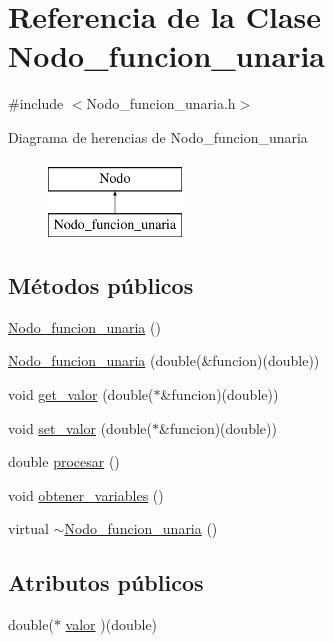 \hypertarget{class_nodo__funcion__unaria}{}\section{Referencia de la Clase Nodo\+\_\+funcion\+\_\+unaria}
\label{class_nodo__funcion__unaria}


{\ttfamily \#include $<$Nodo\+\_\+funcion\+\_\+unaria.\+h$>$}

Diagrama de herencias de Nodo\+\_\+funcion\+\_\+unaria\begin{figure}[H]
\begin{center}
\leavevmode
\includegraphics[height=2.000000cm]{class_nodo__funcion__unaria}
\end{center}
\end{figure}
\subsection*{Métodos públicos}
\begin{DoxyCompactItemize}
\item 
\hyperlink{class_nodo__funcion__unaria_ad8b8270d7c2bcdefbd7fe8ec0a2ad660}{Nodo\+\_\+funcion\+\_\+unaria} ()
\item 
\hyperlink{class_nodo__funcion__unaria_aae3c3384f4214e8c21b992894228023e}{Nodo\+\_\+funcion\+\_\+unaria} (double(\&funcion)(double))
\item 
void \hyperlink{class_nodo__funcion__unaria_ada80a2928510b76650aa2c336f9db8fa}{get\+\_\+valor} (double($\ast$\&funcion)(double))
\item 
void \hyperlink{class_nodo__funcion__unaria_a4634ffcf664c11c2cd5d4546c429476c}{set\+\_\+valor} (double($\ast$\&funcion)(double))
\item 
double \hyperlink{class_nodo__funcion__unaria_a1d6be00c52fad541beccf20bcf1a9122}{procesar} ()
\item 
void \hyperlink{class_nodo__funcion__unaria_a12bf4ec6430f11f4ffb4421a2f4af6f0}{obtener\+\_\+variables} ()
\item 
virtual \hyperlink{class_nodo__funcion__unaria_abd0b606fe115658eded2e1b65c2a94b5}{$\sim$\+Nodo\+\_\+funcion\+\_\+unaria} ()
\end{DoxyCompactItemize}
\subsection*{Atributos públicos}
\begin{DoxyCompactItemize}
\item 
double($\ast$ \hyperlink{class_nodo__funcion__unaria_ab9407e53aabe85b4c725b82a1f4a25be}{valor} )(double)
\end{DoxyCompactItemize}


